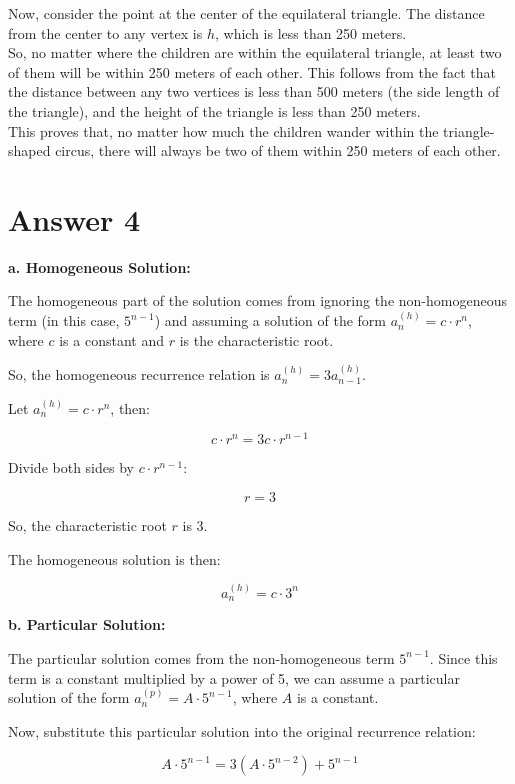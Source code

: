 \documentclass[12pt]{article}
\begin{document}
    Now, consider the point at the center of the equilateral triangle. The distance from the center to any vertex is \( h \), which is less than 250 meters.\\

    So, no matter where the children are within the equilateral triangle, at least two of them will be within 250 meters of each other. This follows from the fact that the distance between any two vertices is less than 500 meters (the side length of the triangle), and the height of the triangle is less than 250 meters.\\

    This proves that, no matter how much the children wander within the triangle-shaped circus, there will always be two of them within 250 meters of each other.\\

\section*{Answer 4}
\textbf{a. Homogeneous Solution:}

The homogeneous part of the solution comes from ignoring the non-homogeneous term (in this case, \(5^{n-1}\)) and assuming a solution of the form \(a_n^{(h)} = c \cdot r^n\), where \(c\) is a constant and \(r\) is the characteristic root.

So, the homogeneous recurrence relation is \(a_n^{(h)} = 3a_{n-1}^{(h)}\).

Let \(a_n^{(h)} = c \cdot r^n\), then:

\[c \cdot r^n = 3c \cdot r^{n-1}\]

Divide both sides by \(c \cdot r^{n-1}\):

\[r = 3\]

So, the characteristic root \(r\) is 3.

The homogeneous solution is then:

\[a_n^{(h)} = c \cdot 3^n\]

\textbf{b. Particular Solution:}

The particular solution comes from the non-homogeneous term \(5^{n-1}\). Since this term is a constant multiplied by a power of 5, we can assume a particular solution of the form \(a_n^{(p)} = A \cdot 5^{n-1}\), where \(A\) is a constant.

Now, substitute this particular solution into the original recurrence relation:

\[A \cdot 5^{n-1} = 3(A \cdot 5^{n-2}) + 5^{n-1}\]
\end{document}
